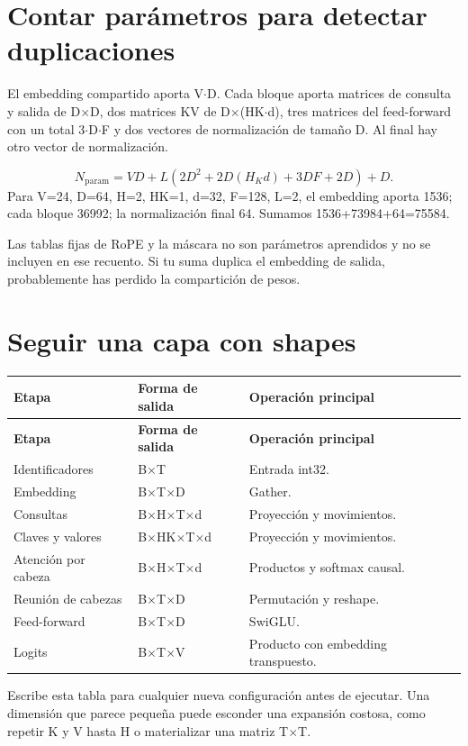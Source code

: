 \documentclass[12pt,a4paper,oneside]{report}
\begin{document}
\section{Contar parámetros para detectar duplicaciones}
El embedding compartido aporta V\ensuremath{\cdot}D. Cada bloque aporta matrices de consulta y salida de D\ensuremath{\times}D, dos matrices KV de D\ensuremath{\times}(HK\ensuremath{\cdot}d), tres matrices del feed-forward con un total 3\ensuremath{\cdot}D\ensuremath{\cdot}F y dos vectores de normalización de tamaño D. Al final hay otro vector de normalización.

\[
N_{\text{param}}=VD+L\left(2D^2+2D(H_Kd)+3DF+2D\right)+D.
\]
Para V=24, D=64, H=2, HK=1, d=32, F=128, L=2, el embedding aporta 1536; cada bloque 36992; la normalización final 64. Sumamos 1536+73984+64=75584.

Las tablas fijas de RoPE y la máscara no son parámetros aprendidos y no se incluyen en ese recuento. Si tu suma duplica el embedding de salida, probablemente has perdido la compartición de pesos.

\section{Seguir una capa con shapes}
{\small
\begin{longtable}{@{}P{0.28\textwidth}P{0.32\textwidth}P{0.34\textwidth}@{}}
\toprule
\textbf{Etapa} & \textbf{Forma de salida} & \textbf{Operación principal}\\
\midrule
\endfirsthead
\toprule
\textbf{Etapa} & \textbf{Forma de salida} & \textbf{Operación principal}\\
\midrule
\endhead
Identificadores & B\ensuremath{\times}T & Entrada int32.\\
Embedding & B\ensuremath{\times}T\ensuremath{\times}D & Gather.\\
Consultas & B\ensuremath{\times}H\ensuremath{\times}T\ensuremath{\times}d & Proyección y movimientos.\\
Claves y valores & B\ensuremath{\times}HK\ensuremath{\times}T\ensuremath{\times}d & Proyección y movimientos.\\
Atención por cabeza & B\ensuremath{\times}H\ensuremath{\times}T\ensuremath{\times}d & Productos y softmax causal.\\
Reunión de cabezas & B\ensuremath{\times}T\ensuremath{\times}D & Permutación y reshape.\\
Feed-forward & B\ensuremath{\times}T\ensuremath{\times}D & SwiGLU.\\
Logits & B\ensuremath{\times}T\ensuremath{\times}V & Producto con embedding transpuesto.\\
\bottomrule
\end{longtable}
}
Escribe esta tabla para cualquier nueva configuración antes de ejecutar. Una dimensión que parece pequeña puede esconder una expansión costosa, como repetir K y V hasta H o materializar una matriz T\ensuremath{\times}T.
\end{document}
